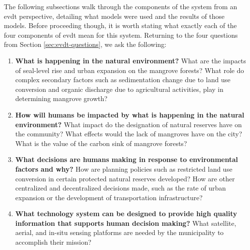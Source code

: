 The following subsections walk through the components of the system from an \acf{evdt} perspective, detailing what models were used and the results of those models. Before proceeding though, it is worth stating what exactly each of the four components of \ac{evdt} mean for this system. Returning to the four questions from Section \ref{sec:evdt-questions}, we ask the following:

\begin{enumerate}[itemsep=0pt,parsep=0pt]
	\item \textbf{What is happening in the natural environment?} What are the impacts of seal-level rise and urban expansion on the mangrove forests? What role do complex secondary factors such as sedimentation change due to land use conversion and organic discharge due to agricultural activities, play in determining mangrove growth? 
	\item \textbf{How will humans be impacted by what is happening in the natural environment?} What impact do the designation of natural reserves have on the community? What effects would the lack of mangroves have on the city? What is the value of the carbon sink of mangrove forests?
	\item \textbf{What decisions are humans making in response to environmental factors and why?} How are planning policies such as restricted land use conversion in certain protected natural reserves developed? How are other centralized and decentralized decisions made, such as the rate of urban expansion or the development of transportation infrastructure? 
	\item \textbf{What technology system can be designed to provide high quality information that supports human decision making?} What satellite, aerial, and in-situ sensing platforms are needed by the municipality to accomplish their mission?
\end{enumerate}


%

